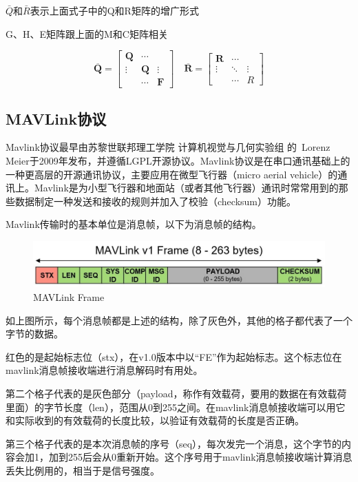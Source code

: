 $\bar{Q}$和$\bar{R}$表示上面式子中的Q和R矩阵的增广形式

G、H、E矩阵跟上面的M和C矩阵相关

$$
\overline{\boldsymbol{Q}}=\left[\begin{array}{ccc}\boldsymbol{Q} & \cdots & \\\vdots & \boldsymbol{Q} & \vdots \\& \cdots & \boldsymbol{F}\end{array}\right] \quad \overline{\boldsymbol{R}}=\left[\begin{array}{ccc}\boldsymbol{R} & \cdots & \\\vdots & \ddots & \vdots \\& \cdots & R\end{array}\right]
$$

\subsection{MAVLink协议}

Mavlink协议最早由苏黎世联邦理工学院 计算机视觉与几何实验组 的 Lorenz Meier于2009年发布，并遵循LGPL开源协议。Mavlink协议是在串口通讯基础上的一种更高层的开源通讯协议，主要应用在微型飞行器（micro aerial vehicle）的通讯上。Mavlink是为小型飞行器和地面站（或者其他飞行器）通讯时常常用到的那些数据制定一种发送和接收的规则并加入了校验（checksum）功能。

Mavlink传输时的基本单位是消息帧，以下为消息帧的结构。

\begin{figure}[ht]
  \centering
  \includegraphics[width=0.8\linewidth]{./Figure/Mavlink_Frame.jpg}
  \caption{MAVLink Frame}\label{Fig:xd1}
\end{figure}

如上图所示，每个消息帧都是上述的结构，除了灰色外，其他的格子都代表了一个字节的数据。

红色的是起始标志位（stx），在v1.0版本中以“FE”作为起始标志。这个标志位在mavlink消息帧接收端进行消息解码时有用处。

第二个格子代表的是灰色部分（payload，称作有效载荷，要用的数据在有效载荷里面）的字节长度（len），范围从0到255之间。在mavlink消息帧接收端可以用它和实际收到的有效载荷的长度比较，以验证有效载荷的长度是否正确。

第三个格子代表的是本次消息帧的序号（seq），每次发完一个消息，这个字节的内容会加1，加到255后会从0重新开始。这个序号用于mavlink消息帧接收端计算消息丢失比例用的，相当于是信号强度。

